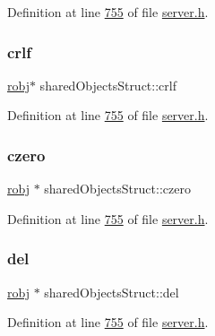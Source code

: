 Definition at line \hyperlink{server_8h_source_l00755}{755} of file \hyperlink{server_8h_source}{server.\+h}.

\mbox{\label{structsharedObjectsStruct_aa65dd34f76e2af8a9f9837ebb1ce7316}} 
\subsubsection{\texorpdfstring{crlf}{crlf}}
{\footnotesize\ttfamily \hyperlink{structredisObject}{robj}$\ast$ shared\+Objects\+Struct\+::crlf}



Definition at line \hyperlink{server_8h_source_l00755}{755} of file \hyperlink{server_8h_source}{server.\+h}.

\mbox{\label{structsharedObjectsStruct_a37b93664f5608c1961f583cf0274a6df}} 
\subsubsection{\texorpdfstring{czero}{czero}}
{\footnotesize\ttfamily \hyperlink{structredisObject}{robj} $\ast$ shared\+Objects\+Struct\+::czero}



Definition at line \hyperlink{server_8h_source_l00755}{755} of file \hyperlink{server_8h_source}{server.\+h}.

\mbox{\label{structsharedObjectsStruct_a5ae05c2a25564135335a0dfbe9765e82}} 
\subsubsection{\texorpdfstring{del}{del}}
{\footnotesize\ttfamily \hyperlink{structredisObject}{robj} $\ast$ shared\+Objects\+Struct\+::del}



Definition at line \hyperlink{server_8h_source_l00755}{755} of file \hyperlink{server_8h_source}{server.\+h}.

